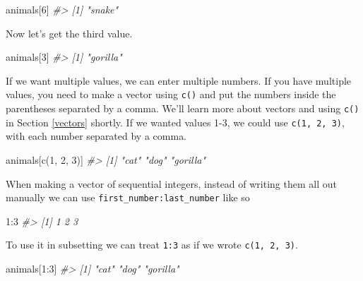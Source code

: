 \documentclass[
  12pt,
]{book}
\newenvironment{Shaded}{\begin{snugshade}}{\end{snugshade}}
\newcommand{\CommentTok}[1]{\textcolor[rgb]{0.37,0.37,0.37}{\textit{#1}}}
\newcommand{\DecValTok}[1]{\textcolor[rgb]{0.06,0.06,0.06}{#1}}
\newcommand{\FunctionTok}[1]{\textcolor[rgb]{0,0,0}{#1}}
\newcommand{\NormalTok}[1]{#1}
\newcommand{\SpecialCharTok}[1]{\textcolor[rgb]{0,0,0}{#1}}
\begin{document}
\begin{Shaded}
\begin{Highlighting}[]
\NormalTok{animals[}\DecValTok{6}\NormalTok{]}
\CommentTok{\#\textgreater{} [1] "snake"}
\end{Highlighting}
\end{Shaded}

Now let's get the third value.

\begin{Shaded}
\begin{Highlighting}[]
\NormalTok{animals[}\DecValTok{3}\NormalTok{]}
\CommentTok{\#\textgreater{} [1] "gorilla"}
\end{Highlighting}
\end{Shaded}

If we want multiple values, we can enter multiple numbers. If you have multiple values, you need to make a vector using \texttt{c()} and put the numbers inside the parentheses separated by a comma. We'll learn more about vectors and using \texttt{c()} in Section \ref{vectors} shortly. If we wanted values 1-3, we could use \texttt{c(1,\ 2,\ 3)}, with each number separated by a comma.

\begin{Shaded}
\begin{Highlighting}[]
\NormalTok{animals[}\FunctionTok{c}\NormalTok{(}\DecValTok{1}\NormalTok{, }\DecValTok{2}\NormalTok{, }\DecValTok{3}\NormalTok{)]}
\CommentTok{\#\textgreater{} [1] "cat"     "dog"     "gorilla"}
\end{Highlighting}
\end{Shaded}

When making a vector of sequential integers, instead of writing them all out manually we can use \texttt{first\_number:last\_number} like so

\begin{Shaded}
\begin{Highlighting}[]
\DecValTok{1}\SpecialCharTok{:}\DecValTok{3}
\CommentTok{\#\textgreater{} [1] 1 2 3}
\end{Highlighting}
\end{Shaded}

To use it in subsetting we can treat \texttt{1:3} as if we wrote \texttt{c(1,\ 2,\ 3)}.

\begin{Shaded}
\begin{Highlighting}[]
\NormalTok{animals[}\DecValTok{1}\SpecialCharTok{:}\DecValTok{3}\NormalTok{]}
\CommentTok{\#\textgreater{} [1] "cat"     "dog"     "gorilla"}
\end{Highlighting}
\end{Shaded}
\end{document}
